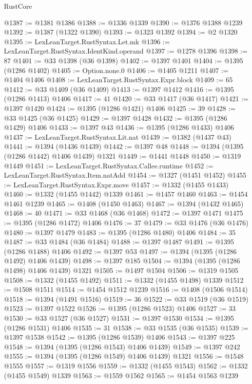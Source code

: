 \begin{lexlean}{RustCore}
\begin{coremodule}
@1387 := @1381 @1386
@1388 := @1336 @1339
@1390 := @1376 @1388 @1239
@1392 := @1387 (@1322 @1390)
@1393 := @1323 @1392
@1394 := @2 @1320
@1395 := LexLeanTarget.RustSyntax.Let.mk
@1396 := LexLeanTarget.RustSyntax.IdentKind.operand
@1397 := @1278 @1396
@1398 := 87
@1401 := @33 @1398 (@36 @1398)
@1402 := @1397 @1401
@1404 := @1395 (@1286 @1402)
@1405 := Option.none.{0}
@1406 := @1405 @1211
@1407 := @1404 @1406
@1408 := LexLeanTarget.RustSyntax.Expr.block
@1409 := 65
@1412 := @33 @1409 (@36 @1409)
@1413 := @1397 @1412
@1416 := @1395 (@1286 @1413) @1406
@1417 := 41
@1420 := @33 @1417 (@36 @1417)
@1421 := @1397 @1420
@1424 := @1395 (@1286 @1421) @1406
@1425 := 39
@1428 := @33 @1425 (@36 @1425)
@1429 := @1397 @1428
@1432 := @1395 (@1286 @1429) @1406
@1433 := @1397 @43
@1436 := @1395 (@1286 @1433) @1406
@1437 := LexLeanTarget.RustSyntax.Lit.nat
@1439 := @1382 (@1437 @43)
@1441 := @1394 (@1436 @1439)
@1442 := @1397 @48
@1448 := @1394 (@1395 (@1286 @1442) @1406 @1439) @1321
@1449 := @1441 @1448
@1450 := @1319 @1449
@1451 := LexLeanTarget.RustSyntax.Callee.runtime
@1452 := LexLeanTarget.RustSyntax.Item.natAdd
@1454 := @1327 (@1451 @1452)
@1455 := LexLeanTarget.RustSyntax.Expr.move
@1457 := @1332 (@1455 @1433)
@1460 := @1332 (@1455 @1442) @1339
@1461 := @1457 @1460
@1463 := @1454 @1461 @1239
@1465 := @1408 (@1450 @1463)
@1467 := @1394 (@1432 @1465)
@1468 := 40
@1471 := @33 @1468 (@36 @1468)
@1472 := @1397 @1471
@1475 := @1395 (@1286 @1472) @1406
@1476 := 37
@1479 := @33 @1476 (@36 @1476)
@1480 := @1397 @1479
@1483 := @1395 (@1286 @1480) @1406
@1484 := 35
@1487 := @33 @1484 (@36 @1484)
@1488 := @1397 @1487
@1491 := @1395 (@1286 @1488) @1406
@1492 := @1397 @53
@1497 := @1394 (@1395 (@1286 @1492) @1406 @1439)
@1498 := @1397 @185
@1504 := @1394 (@1395 (@1286 @1498) @1406 @1439) @1321
@1505 := @1497 @1504
@1506 := @1319 @1505
@1508 := @1332 (@1455 @1492)
@1511 := @1332 (@1455 @1498) @1339
@1512 := @1508 @1511
@1514 := @1454 @1512 @1239
@1516 := @1408 (@1506 @1514)
@1518 := @1394 (@1491 @1516)
@1519 := 36
@1522 := @33 @1519 (@36 @1519)
@1523 := @1397 @1522
@1526 := @1395 (@1286 @1523) @1406
@1527 := 33
@1530 := @33 @1527 (@36 @1527)
@1531 := @1397 @1530
@1534 := @1395 (@1286 @1531) @1406
@1535 := 31
@1538 := @33 @1535 (@36 @1535)
@1539 := @1397 @1538
@1542 := @1395 (@1286 @1539) @1406
@1543 := @1397 @225
@1548 := @1394 (@1395 (@1286 @1543) @1406 @1439)
@1549 := @1397 @242
@1555 := @1394 (@1395 (@1286 @1549) @1406 @1439) @1321
@1556 := @1548 @1555
@1557 := @1319 @1556
@1559 := @1332 (@1455 @1543)
@1562 := @1332 (@1455 @1549) @1339
@1563 := @1559 @1562
@1565 := @1454 @1563 @1239

\end{coremodule}
\end{lexlean}
